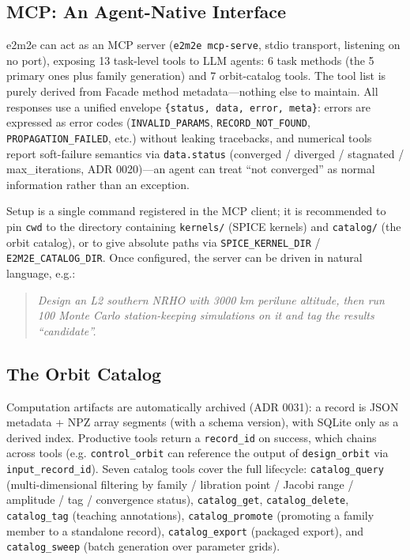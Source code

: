 \subsection{MCP: An Agent-Native Interface}

e2m2e can act as an MCP server (\texttt{e2m2e mcp-serve}, stdio transport,
listening on no port), exposing 13 task-level tools to LLM agents: 6 task
methods (the 5 primary ones plus family generation) and 7 orbit-catalog
tools. The tool list is purely derived from Facade method metadata---nothing
else to maintain. All responses use a unified envelope
\texttt{\{status, data, error, meta\}}: errors are expressed as error codes
(\texttt{INVALID\_PARAMS}, \texttt{RECORD\_NOT\_FOUND},
\texttt{PROPAGATION\_FAILED}, etc.) without leaking tracebacks, and numerical
tools report soft-failure semantics via \texttt{data.status} (converged /
diverged / stagnated / max\_iterations, ADR 0020)---an agent can treat
``not converged'' as normal information rather than an exception.

Setup is a single command registered in the MCP client; it is recommended to
pin \texttt{cwd} to the directory containing \texttt{kernels/} (SPICE
kernels) and \texttt{catalog/} (the orbit catalog), or to give absolute paths
via \texttt{SPICE\_KERNEL\_DIR} / \texttt{E2M2E\_CATALOG\_DIR}. Once
configured, the server can be driven in natural language, e.g.:

\begin{quote}\itshape
Design an L2 southern NRHO with 3000 km perilune altitude, then run 100
Monte Carlo station-keeping simulations on it and tag the results
``candidate''.
\end{quote}

\subsection{The Orbit Catalog}

Computation artifacts are automatically archived (ADR 0031): a record is JSON
metadata + NPZ array segments (with a schema version), with SQLite only as a
derived index. Productive tools return a \texttt{record\_id} on success,
which chains across tools (e.g. \texttt{control\_orbit} can reference the
output of \texttt{design\_orbit} via \texttt{input\_record\_id}). Seven
catalog tools cover the full lifecycle: \texttt{catalog\_query}
(multi-dimensional filtering by family / libration point / Jacobi range /
amplitude / tag / convergence status), \texttt{catalog\_get},
\texttt{catalog\_delete}, \texttt{catalog\_tag} (teaching annotations),
\texttt{catalog\_promote} (promoting a family member to a standalone record),
\texttt{catalog\_export} (packaged export), and \texttt{catalog\_sweep}
(batch generation over parameter grids).

